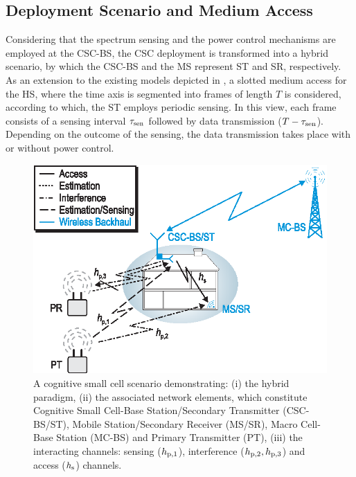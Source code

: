 \subsection{Deployment Scenario and Medium Access}
Considering that the spectrum sensing and the power control mechanisms are employed at the CSC-BS, the CSC deployment is transformed into a hybrid scenario, by which the CSC-BS and the MS represent ST and SR, respectively. As an extension to the existing models depicted in \cite{Kang09, Sharma14}, a slotted medium access for the HS, where the time axis is segmented into frames of length $T$ is considered, according to which, the ST employs periodic sensing. In this view, each frame consists of a sensing interval $\tau_{\text{sen}}$ followed by data transmission ($T - \tau_{\text{sen}}$). Depending on the outcome of the sensing, the data transmission takes place  with or without power control. 
\begin{figure}[!t]
\centering
\includegraphics[width = \figscalet]{figures/CR_Scenario_Hybrid}
\caption{A cognitive small cell scenario demonstrating: (i) the hybrid paradigm, (ii) the associated network elements, which constitute Cognitive Small Cell-Base Station/Secondary Transmitter (CSC-BS/ST), Mobile Station/Secondary Receiver (MS/SR), Macro Cell-Base Station (MC-BS) and Primary Transmitter (PT), (iii) the interacting channels: sensing ($h_{\text{p,1}}$), interference ($h_{\text{p,2}}, h_{\text{p,3}}$) and access ($h_{\text{s}}$) channels.}
\label{fig:scenario}
\end{figure}

